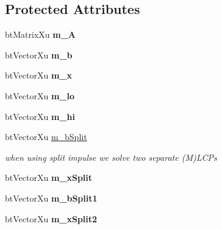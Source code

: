 \subsection*{Protected Attributes}
\begin{DoxyCompactItemize}
\item 
\mbox{\label{classbtMLCPSolver_ab19d782b7687c2c0598a26678a904c3d}} 
bt\+Matrix\+Xu {\bfseries m\+\_\+A}
\item 
\mbox{\label{classbtMLCPSolver_a102a9cbe5333f818bd57ab58a61c9fa3}} 
bt\+Vector\+Xu {\bfseries m\+\_\+b}
\item 
\mbox{\label{classbtMLCPSolver_a79ad61721583b308de8be07cd33e67ae}} 
bt\+Vector\+Xu {\bfseries m\+\_\+x}
\item 
\mbox{\label{classbtMLCPSolver_ae7a49a4a3ef55eadd59ec64a2d2dce0d}} 
bt\+Vector\+Xu {\bfseries m\+\_\+lo}
\item 
\mbox{\label{classbtMLCPSolver_aaa4243bdf7468736d75c9da113153832}} 
bt\+Vector\+Xu {\bfseries m\+\_\+hi}
\item 
\mbox{\label{classbtMLCPSolver_a9c1feb6855fa296c8ca582842f8e4fe3}} 
bt\+Vector\+Xu \hyperlink{classbtMLCPSolver_a9c1feb6855fa296c8ca582842f8e4fe3}{m\+\_\+b\+Split}
\begin{DoxyCompactList}\small\item\em when using \textquotesingle{}split impulse\textquotesingle{} we solve two separate (M)L\+C\+Ps \end{DoxyCompactList}\item 
\mbox{\label{classbtMLCPSolver_a87e493a2efd02e6ec58cdfd6806fc01d}} 
bt\+Vector\+Xu {\bfseries m\+\_\+x\+Split}
\item 
\mbox{\label{classbtMLCPSolver_a2ab2e9fed2b0d44ec90d4e4b430b9af5}} 
bt\+Vector\+Xu {\bfseries m\+\_\+b\+Split1}
\item 
\mbox{\label{classbtMLCPSolver_ae570d6bb5466fcc50b94edaf608e9f40}} 
bt\+Vector\+Xu {\bfseries m\+\_\+x\+Split2}
\item 

\end{DoxyCompactItemize}

